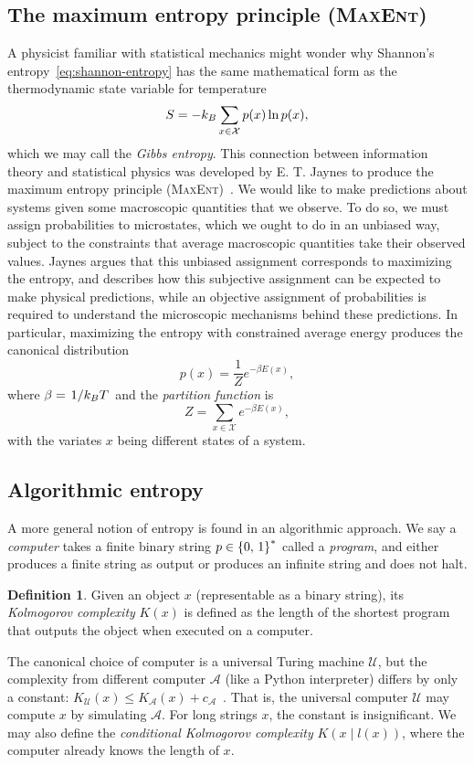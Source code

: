 \documentclass[aps,reprint,floatfix]{revtex4-2}
\renewcommand\mathrm\textnormal%
\theoremstyle{plain}
\theoremstyle{definition}
\newtheorem*{defn*}{Definition}
\renewcommand\leq\leqslant%
\renewcommand\ln{\operatorname{\mathrm{ln}}}
\begin{document}
\subsection{The maximum entropy principle (\textsc{MaxEnt})}\label{sec:maxent}

A physicist familiar with statistical mechanics might wonder why Shannon's
entropy~\eqref{eq:shannon-entropy} has the same mathematical form as the
thermodynamic state variable for temperature
\begin{equation}
  S
  = -k_B \sum_{x \in \mathcal{X}} p(x) \ln p(x),
  \label{eq:gibbs-entropy}
\end{equation}
which we may call the \emph{Gibbs entropy}. This connection between information
theory and statistical physics was developed by E. T. Jaynes to produce the
maximum entropy principle (\textsc{MaxEnt})~\cite{jaynes1957information}. We
would like to make predictions about systems given some macroscopic quantities
that we observe. To do so, we must assign probabilities to microstates, which we
ought to do in an unbiased way, subject to the constraints that average
macroscopic quantities take their observed values. Jaynes argues that this
unbiased assignment corresponds to maximizing the entropy, and describes how
this subjective assignment can be expected to make physical predictions, while
an objective assignment of probabilities is required to understand the
microscopic mechanisms behind these predictions. In particular, maximizing the
entropy with constrained average energy produces the canonical
distribution~\cite{jaynes1957information}
\[
  p(x)
  = \frac{1}{Z}e^{-\beta E(x)},
\]
where $\beta = \flatfrac{1}{k_B T}$ and the \emph{partition function} is
\[
  Z
  = \sum_{x \in \mathcal{X}} e^{-\beta E(x)},
\]
with the variates $x$ being different states of a system.

\subsection{Algorithmic entropy}

A more general notion of entropy is found in an algorithmic approach. We say a
\emph{computer} takes a finite binary string $p \in \qty{0,\, 1}^*$ called a
\emph{program}, and either produces a finite string as output or produces an
infinite string and does not halt.
\begin{defn*}\label{def:kolmogorov}
  Given an object $x$ (representable as a binary string), its \emph{Kolmogorov
  complexity} $K(x)$ is defined as the length of the shortest program that
  outputs the object when executed on a computer.
\end{defn*}
The canonical choice of computer is a universal Turing machine $\mathcal{U}$,
but the complexity from different computer $\mathcal{A}$ (like a Python
interpreter) differs by only a constant: $K_{\mathcal{U}}(x) \leq
K_{\mathcal{A}}(x) + c_{\mathcal{A}}$~\cite[p.~467]{cover}. That is, the
universal computer $\mathcal{U}$ may compute $x$ by simulating $\mathcal{A}$.
For long strings $x$, the constant is insignificant. We may also define the
\emph{conditional Kolmogorov complexity} $K(x \mathbin{|} l(x))$, where the
computer already knows the length of $x$.
\end{document}
